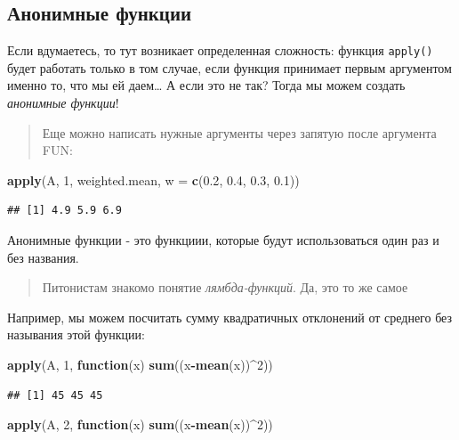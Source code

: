 \documentclass[]{book}
\newenvironment{Shaded}{\begin{snugshade}}{\end{snugshade}}
\newcommand{\KeywordTok}[1]{\textcolor[rgb]{0.13,0.29,0.53}{\textbf{#1}}}
\newcommand{\DataTypeTok}[1]{\textcolor[rgb]{0.13,0.29,0.53}{#1}}
\newcommand{\DecValTok}[1]{\textcolor[rgb]{0.00,0.00,0.81}{#1}}
\newcommand{\FloatTok}[1]{\textcolor[rgb]{0.00,0.00,0.81}{#1}}
\newcommand{\ControlFlowTok}[1]{\textcolor[rgb]{0.13,0.29,0.53}{\textbf{#1}}}
\newcommand{\OperatorTok}[1]{\textcolor[rgb]{0.81,0.36,0.00}{\textbf{#1}}}
\newcommand{\NormalTok}[1]{#1}
\begin{document}
\subsection{Анонимные функции}\label{anon}

Если вдумаетесь, то тут возникает определенная сложность: функция
\texttt{apply()} будет работать только в том случае, если функция
принимает первым аргументом именно то, что мы ей даем\ldots{} А если это
не так? Тогда мы можем создать \emph{анонимные функции}!

\begin{quote}
Еще можно написать нужные аргументы через запятую после аргумента FUN:
\end{quote}

\begin{Shaded}
\begin{Highlighting}[]
\KeywordTok{apply}\NormalTok{(A, }\DecValTok{1}\NormalTok{, weighted.mean, }\DataTypeTok{w =} \KeywordTok{c}\NormalTok{(}\FloatTok{0.2}\NormalTok{, }\FloatTok{0.4}\NormalTok{, }\FloatTok{0.3}\NormalTok{, }\FloatTok{0.1}\NormalTok{)) }
\end{Highlighting}
\end{Shaded}

\begin{verbatim}
## [1] 4.9 5.9 6.9
\end{verbatim}

Анонимные функции - это функциии, которые будут использоваться один раз
и без названия.

\begin{quote}
Питонистам знакомо понятие \emph{лямбда-функций}. Да, это то же самое
\end{quote}

Например, мы можем посчитать сумму квадратичных отклонений от среднего
без называния этой функции:

\begin{Shaded}
\begin{Highlighting}[]
\KeywordTok{apply}\NormalTok{(A, }\DecValTok{1}\NormalTok{, }\ControlFlowTok{function}\NormalTok{(x) }\KeywordTok{sum}\NormalTok{((x}\OperatorTok{-}\KeywordTok{mean}\NormalTok{(x))}\OperatorTok{^}\DecValTok{2}\NormalTok{))}
\end{Highlighting}
\end{Shaded}

\begin{verbatim}
## [1] 45 45 45
\end{verbatim}

\begin{Shaded}
\begin{Highlighting}[]
\KeywordTok{apply}\NormalTok{(A, }\DecValTok{2}\NormalTok{, }\ControlFlowTok{function}\NormalTok{(x) }\KeywordTok{sum}\NormalTok{((x}\OperatorTok{-}\KeywordTok{mean}\NormalTok{(x))}\OperatorTok{^}\DecValTok{2}\NormalTok{))}
\end{Highlighting}
\end{Shaded}
\end{document}
